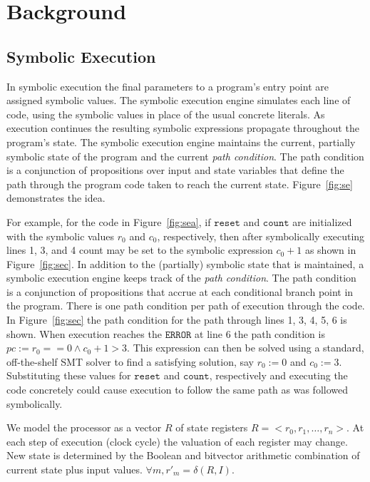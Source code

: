 \section{Background}
\subsection{Symbolic Execution}
In symbolic execution the final parameters to a program's entry point are
assigned symbolic values. The symbolic execution engine simulates each line of
code, using the symbolic values in place of the usual concrete literals. As
execution continues the resulting symbolic expressions propagate throughout the program's
state. The symbolic execution engine
maintains the current, partially symbolic state of the program and the current
\emph{path condition}. The path condition is a conjunction of propositions over
input and state variables that define the path through the program code taken to
reach the current state. Figure~\ref{fig:se} demonstrates the idea. 

For example, for the code in
Figure~\ref{fig:sea}, if $\mathtt{reset}$ and $\mathtt{count}$ are initialized
with the symbolic values $r_0$ and $c_0$, respectively, then after symbolically
executing lines 1, 3, and 4 count may be set to the symbolic expression $c_0 +
1$ as shown in Figure~\ref{fig:sec}. In addition to the (partially) symbolic
state that is maintained, a symbolic execution engine keeps track of the
\emph{path condition}. The path condition is a conjunction of propositions that
accrue at each conditional branch point in the program. There is one path
condition per path of execution through the code. In Figure~\ref{fig:sec} the
path condition for the path through lines 1, 3, 4, 5, 6 is shown. When execution
reaches the $\mathtt{ERROR}$ at line 6 the path condition is $\mathit{pc} := r_0
== 0 \wedge c_0 + 1 > 3$. This expression can then be solved using a standard,
off-the-shelf SMT solver to find a satisfying solution, say $r_0 := 0$ and $c_0
:= 3$. Substituting these values for $\mathtt{reset}$ and $\mathtt{count}$,
respectively and executing the code concretely could cause execution to follow
the same path as was followed symbolically.

We model the processor as a vector $R$ of state registers $R = <r_0, r_1,
\ldots, r_n>$. At each step of execution (clock cycle) the valuation of each
register may change. New state is determined by the Boolean and bitvector
arithmetic combination of current state plus input values. $\forall m, r'_m =
\delta(R,I)$.

